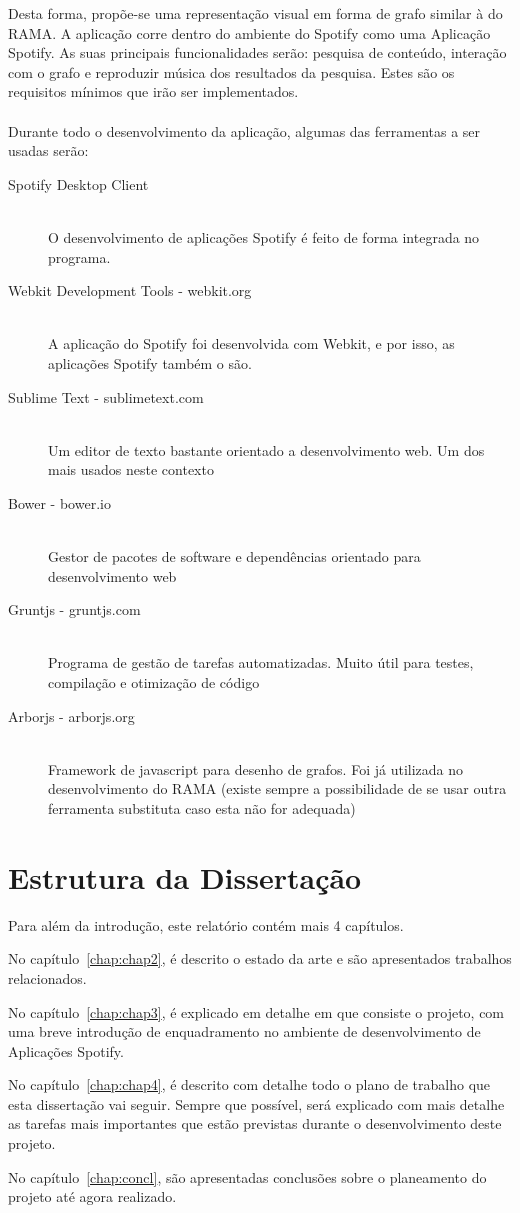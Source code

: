 Desta forma, propõe-se uma representação visual em forma de grafo similar à do RAMA.
A aplicação corre dentro do ambiente do Spotify como uma Aplicação Spotify.
As suas principais funcionalidades serão: pesquisa de conteúdo, interação com o grafo e reproduzir música dos resultados da pesquisa.
Estes são os requisitos mínimos que irão ser implementados.
\\
\\
Durante todo o desenvolvimento da aplicação, algumas das ferramentas a ser usadas serão:

\begin{description}
  \item[Spotify Desktop Client] \hfill \\
    O desenvolvimento de aplicações Spotify é feito de forma integrada no programa.
  \item[Webkit Development Tools - webkit.org] \hfill \\
    A aplicação do Spotify foi desenvolvida com Webkit, e por isso, as aplicações Spotify também o são.
  \item[Sublime Text - sublimetext.com] \hfill \\
    Um editor de texto bastante orientado a desenvolvimento web. Um dos mais usados neste contexto
  \item[Bower - bower.io] \hfill \\
    Gestor de pacotes de software e dependências orientado para desenvolvimento web
  \item[Gruntjs - gruntjs.com] \hfill \\
    Programa de gestão de tarefas automatizadas. Muito útil para testes, compilação e otimização de código
  \item[Arborjs - arborjs.org] \hfill \\
    Framework de javascript para desenho de grafos. Foi já utilizada no desenvolvimento do RAMA (existe sempre a possibilidade de se usar outra ferramenta substituta caso esta não for adequada)
\end{description}



\section{Estrutura da Dissertação} \label{sec:struct}

Para além da introdução, este relatório contém mais 4 capítulos.

No capítulo~\ref{chap:chap2}, é descrito o estado da arte e são
apresentados trabalhos relacionados.

No capítulo~\ref{chap:chap3}, é explicado em detalhe em que consiste o projeto, com uma breve introdução de enquadramento no ambiente de desenvolvimento de Aplicações Spotify.

No capítulo~\ref{chap:chap4}, é descrito com detalhe todo o plano de trabalho que esta dissertação vai seguir. 
Sempre que possível, será explicado com mais detalhe as tarefas mais importantes que estão previstas durante o desenvolvimento deste projeto.

No capítulo~\ref{chap:concl}, são apresentadas conclusões sobre o planeamento do projeto até agora realizado.

